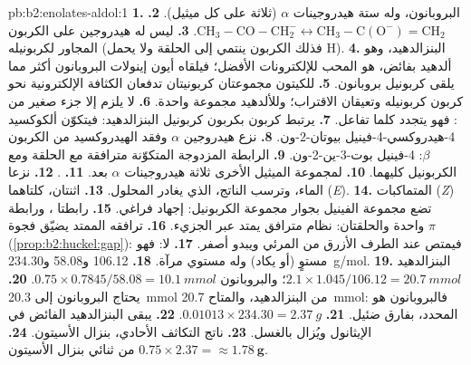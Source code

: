\begin{solution}{pb:b2:enolates-aldol:1}
\textbf{1.} البروبانون، وله ستة هيدروجينات $\alpha$ (ثلاثة على كل ميثيل).
\textbf{2.} $\mathrm{CH_3{-}CO{-}CH_2^-} \leftrightarrow \mathrm{CH_3{-}C(O^-){=}CH_2}$.
\textbf{3.} ليس له هيدروجين على الكربون المجاور لكربونيله (فذلك الكربون ينتمي إلى الحلقة ولا
يحمل H).
\textbf{4.} البنزالدهيد، وهو ألدهيد بفائض، هو المحب للإلكترونات الأفضل؛ فيلقاه أيون إينولات البروبانون
أكثر مما يلقى كربونيل بروبانون.
\textbf{5.} للكيتون مجموعتان كربونيتان تدفعان الكثافة الإلكترونية نحو كربون كربونيله 
وتعيقان الاقتراب؛ وللألدهيد مجموعة واحدة.
\textbf{6.} لا يلزم إلا جزء صغير من : فهو يتجدد كلما تفاعل.
\textbf{7.} يرتبط كربون  بكربون كربونيل البنزالدهيد: فيتكوّن ألكوكسيد
4-هيدروكسي-4-فينيل بيوتان-2-ون.
\textbf{8.} نزع هيدروجين $\alpha$ وفقد الهيدروكسيد من الكربون $\beta$: 4-فينيل بوت-3-ين-2-ون.
\textbf{9.} الرابطة المزدوجة المتكوّنة مترافقة مع الحلقة ومع الكربونيل كليهما.
\textbf{10.} لمجموعة الميثيل الأخرى ثلاثة هيدروجينات $\alpha$ بعد.
\textbf{11.} .
\textbf{12.} نزعا الماء، وترسب الناتج، الذي يغادر المحلول.
\textbf{13.} اثنتان، كلتاهما (\textit{E}).
\textbf{14.} المتماكبات (\textit{Z}) تضع مجموعة الفينيل بجوار مجموعة الكربونيل: إجهاد فراغي.
\textbf{15.} رابطتا ، ورابطة  واحدة والحلقتان: نظام مترافق يمتد عبر الجزيء.
\textbf{16.} ترافقه الممتد يضيّق فجوة $\pi$ (\cref{prop:b2:huckel:gap}): فيمتص عند الطرف
الأزرق من المرئي ويبدو أصفر.
\textbf{17.} لا: فهو مستوٍ (أو يكاد) وله مستوي مرآة.
\textbf{18.} 106.12 و58.08 و\qty{234.30}{g/mol}.
\textbf{19.} البنزالدهيد $2.1 \times 1.045/106.12 = \qty{20.7}{mmol}$؛ والبروبانون $0.75 \times
0.7845/58.08 = \qty{10.1}{mmol}$.
\textbf{20.} يحتاج البروبانون إلى \qty{20.3}{mmol} من البنزالدهيد، والمتاح \qty{20.7}{mmol}:
فالبروبانون هو المحدد، بفارق ضئيل.
\textbf{21.} $0.01013 \times 234.30 = \qty{2.37}{g}$.
\textbf{22.} يبقى البنزالدهيد الفائض في الإيثانول ويُزال بالغسل.
\textbf{23.} ناتج التكاثف الأحادي، بنزال الأسيتون.
\textbf{24.} $0.75 \times 2.37 = \boldsymbol{\approx \qty{1.78}{g}}$ من ثنائي بنزال الأسيتون.
\end{solution}
